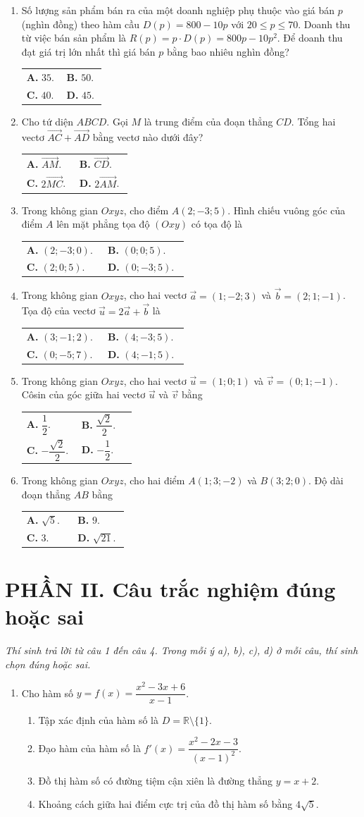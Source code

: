 \documentclass[12pt,a4paper]{article}
\makeatletter
\newcommand{\bonpa}[4]{\par\nobreak\smallskip\nobreak\noindent
\begin{tabular}{@{}p{0.47\linewidth}p{0.47\linewidth}@{}}
\textbf{A.} #1 & \textbf{B.} #2\\[8pt]
\textbf{C.} #3 & \textbf{D.} #4\end{tabular}}
\makeatother
\begin{document}
\newpage
\begin{enumerate}[start=7]
\item Số lượng sản phẩm bán ra của một doanh nghiệp phụ thuộc vào giá bán $p$ (nghìn đồng) theo hàm cầu $D(p)=800-10p$ với $20\le p\le 70$. Doanh thu từ việc bán sản phẩm là $R(p)=p\cdot D(p)=800p-10p^2$. Để doanh thu đạt giá trị lớn nhất thì giá bán $p$ bằng bao nhiêu nghìn đồng?
\bonpa{$35$.}{$50$.}{$40$.}{$45$.}

\item Cho tứ diện $ABCD$. Gọi $M$ là trung điểm của đoạn thẳng $CD$. Tổng hai vectơ $\vec{AC}+\vec{AD}$ bằng vectơ nào dưới đây?
\bonpa{$\vec{AM}$.}{$\vec{CD}$.}{$2\vec{MC}$.}{$2\vec{AM}$.}

\item Trong không gian $Oxyz$, cho điểm $A(2;-3;5)$. Hình chiếu vuông góc của điểm $A$ lên mặt phẳng tọa độ $(Oxy)$ có tọa độ là
\bonpa{$(2;-3;0)$.}{$(0;0;5)$.}{$(2;0;5)$.}{$(0;-3;5)$.}

\item Trong không gian $Oxyz$, cho hai vectơ $\vec{a}=(1;-2;3)$ và $\vec{b}=(2;1;-1)$. Tọa độ của vectơ $\vec{u}=2\vec{a}+\vec{b}$ là
\bonpa{$(3;-1;2)$.}{$(4;-3;5)$.}{$(0;-5;7)$.}{$(4;-1;5)$.}

\item Trong không gian $Oxyz$, cho hai vectơ $\vec{u}=(1;0;1)$ và $\vec{v}=(0;1;-1)$. Côsin của góc giữa hai vectơ $\vec{u}$ và $\vec{v}$ bằng
\bonpa{$\dfrac{1}{2}$.}{$\dfrac{\sqrt{2}}{2}$.}{$-\dfrac{\sqrt{2}}{2}$.}{$-\dfrac{1}{2}$.}

\item Trong không gian $Oxyz$, cho hai điểm $A(1;3;-2)$ và $B(3;2;0)$. Độ dài đoạn thẳng $AB$ bằng
\bonpa{$\sqrt{5}$.}{$9$.}{$3$.}{$\sqrt{21}$.}
\end{enumerate}

\vspace{3pt}
\section*{\large PHẦN II. Câu trắc nghiệm đúng hoặc sai}
\textit{Thí sinh trả lời từ câu 1 đến câu 4. Trong mỗi ý a), b), c), d) ở mỗi câu, thí sinh chọn đúng hoặc sai.}
\begin{enumerate}
\item Cho hàm số $y=f(x)=\dfrac{x^2-3x+6}{x-1}$.
\begin{enumerate}
\item Tập xác định của hàm số là $D=\mathbb{R}\setminus\{1\}$.
\item Đạo hàm của hàm số là $f'(x)=\dfrac{x^2-2x-3}{(x-1)^2}$.
\item Đồ thị hàm số có đường tiệm cận xiên là đường thẳng $y=x+2$.
\item Khoảng cách giữa hai điểm cực trị của đồ thị hàm số bằng $4\sqrt{5}$.
\end{enumerate}
\end{enumerate}
\end{document}
